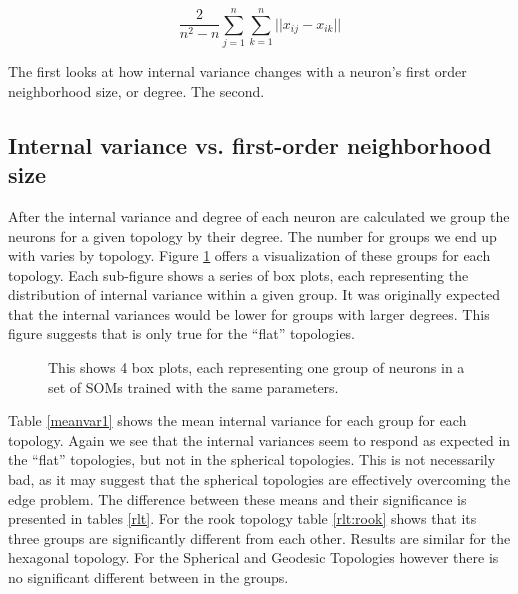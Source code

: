  \begin{equation}
\frac{2}{n^2-n}\sum_{j=1}^n\sum_{k=1}^n ||x_{ij}-x_{ik}||
 \label{eqno1}
 \end{equation}

The first looks at how internal variance changes with a neuron's first
order neighborhood size, or degree.  The second.


\subsection{Internal variance vs. first-order neighborhood size}
After the internal variance and degree of each neuron are calculated we
group the neurons for a given topology by their degree. The number for groups
we end up with varies by topology. Figure \ref{boxplot} offers a visualization
of these groups for each topology.  Each sub-figure shows a series of box
plots, each representing the distribution of internal variance within a given
group.  It was originally expected that the internal variances would be lower
for groups with larger degrees. This figure suggests that is only true for the
``flat'' topologies.

\begin{figure}[hbt]
\label{boxplot}
\centering
{}
\caption{This shows 4 box plots, each representing one group of neurons in a set
of SOMs trained with the same parameters.}
\end{figure}

Table \ref{meanvar1} shows the mean internal variance for each group for each
topology. Again we see that the internal variances seem to respond as expected
in the ``flat'' topologies, but not in the spherical topologies.  This is not
necessarily bad, as it may suggest that the spherical topologies are
effectively overcoming the edge problem.  The difference between these means
and their significance is presented in tables \ref{rlt}.  For the rook
topology table \ref{rlt:rook} shows that its three groups are significantly
different from each other. Results are similar for the hexagonal topology. For
the Spherical and Geodesic Topologies however there is no significant
different between in the groups.


